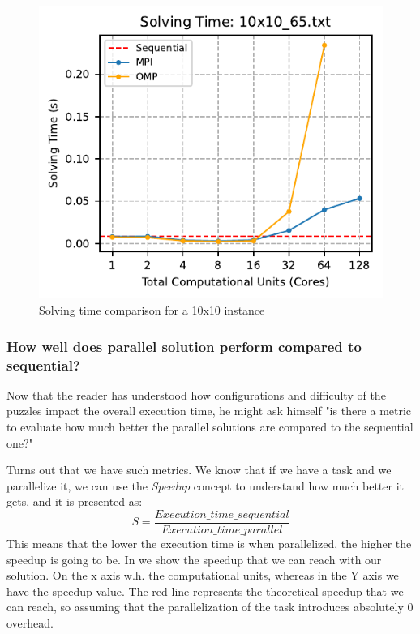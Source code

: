 \begin{figure}[htbp]
\centering
\includegraphics[width=0.9\linewidth]{imgs/comparison_solving_time_10x10_65.pdf}
\caption{Solving time comparison for a 10x10 instance}
\label{fig:comparison_solving_time_10x10}
\end{figure}

\subsubsection{How well does parallel solution perform compared to sequential?}
\label{subsubsec:speedup_efficiency}

Now that the reader has understood how configurations and difficulty of the puzzles impact the overall execution time, he might ask himself "is there a metric to evaluate how much better the parallel solutions are compared to the sequential one?"

Turns out that we have such metrics. We know that if we have a task and we parallelize it, we can use the \textit{Speedup} concept to understand how much better it gets, and it is presented as:
\[
S = \frac{Execution\_time\_sequential}{Execution\_time\_parallel}
\]
This means that the lower the execution time is when parallelized, the higher the speedup is going to be. In  we show the speedup that we can reach with our solution. On the x axis w.h. the computational units, whereas in the Y axis we have the speedup value. The red line represents the theoretical speedup that we can reach, so assuming that the parallelization of the task introduces absolutely 0 overhead.

